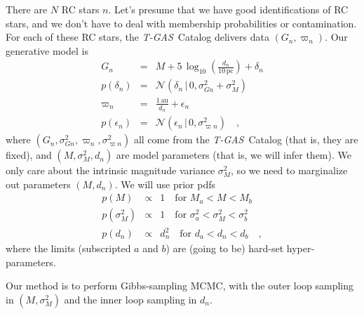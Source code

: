 \documentclass[12pt, letterpaper]{article}
\newcommand{\acronym}[1]{{\small{#1}}}
\newcommand{\project}[1]{\textsl{#1}}
\newcommand{\tgas}{\project{\acronym{T-GAS}}}
\newcommand{\unit}[1]{\mathrm{#1}}
\newcommand{\pc}{\unit{pc}}
\newcommand{\au}{\unit{au}}
\newcommand{\normal}{\mathcal{N}}
\newcommand{\given}{\,|\,}
\begin{document}
There are $N$ RC stars $n$.
Let's presume that we have good identifications of RC stars, and we
don't have to deal with membership probabilities or contamination.
For each of these RC stars, the \tgas\ Catalog delivers data $(G_n,
\varpi_n)$.  Our generative model is
\begin{eqnarray}
  G_n &=& M + 5\,\log_{10}(\frac{d_n}{10\,\pc}) + \delta_n
  \\
  p(\delta_n) &=& \normal(\delta_n\given 0, \sigma_{Gn}^2+\sigma_M^2)
  \\
  \varpi_n &=& \frac{1\,\au}{d_n} + \epsilon_n
  \\
  p(\epsilon_n) &=& \normal(\epsilon_n\given 0, \sigma_{\varpi n}^2)
  \quad ,
\end{eqnarray}
where $(G_n, \sigma_{Gn}^2, \varpi_n, \sigma_{\varpi n}^2)$ all come
from the \tgas\ Catalog (that is, they are fixed), and $(M,
\sigma_M^2, d_n)$ are model parameters (that is, we will infer them).
We only care about the intrinsic magnitude variance $\sigma_M^2$, so
we need to marginalize out parameters $(M, d_n)$.
We will use prior pdfs
\begin{eqnarray}
  p(M) &\propto& 1          \quad\mbox{for $M_a<M<M_b$}
  \\
  p(\sigma_M^2) &\propto& 1 \quad\mbox{for $\sigma_a^2<\sigma_M^2<\sigma_b^2$}
  \\
  p(d_n) &\propto& d_n^2    \quad\mbox{for $d_a < d_n < d_b$}
  \quad,
\end{eqnarray}
where the limits (subscripted $a$ and $b$) are (going to be) hard-set
hyper-parameters.

Our method is to perform Gibbs-sampling MCMC, with the outer loop
sampling in $(M, \sigma_M^2)$ and the inner loop sampling in $d_n$.
\end{document}
